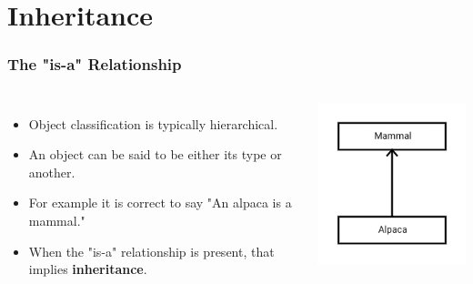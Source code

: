 \documentclass{beamer}
\begin{document}
\section{Inheritance}
\begin{frame}
    \frametitle{The "is-a" Relationship}
    \begin{columns}
    \begin{itemize}
        \item<2-> Object classification is typically hierarchical.
        \item<3-> An object can be said to be either its type or another.
        \item<4-> For example it is correct to say "An alpaca is a mammal."
        \item<5-> When the "is-a" relationship is present, that implies 
            {\bf inheritance}.
    \end{itemize}
    
    \includegraphics[width=\textwidth]{images/mammal}
    \end{columns}
\end{frame}
\end{document}
